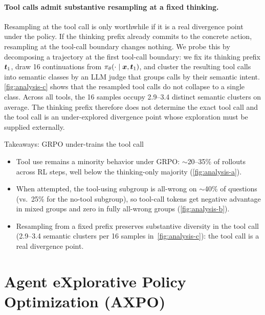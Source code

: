 \paragraph{Tool calls admit substantive resampling at a fixed thinking.}
Resampling at the tool call is only worthwhile if it is a real divergence point under the policy.
If the thinking prefix already commits to the concrete action, resampling at the tool-call boundary changes nothing.
We probe this by decomposing a trajectory at the first tool-call boundary: we fix its thinking prefix ${\bm{t}}_1$, draw 16 continuations from $\pi_\theta(\cdot \mid {\bm{x}}, {\bm{t}}_1)$, and cluster the resulting tool calls into semantic classes by an LLM judge that groups calls by their semantic intent. \autoref{fig:analysis-c} shows that the resampled tool calls do not collapse to a single class. Across all tools, the 16 samples occupy 2.9--3.4 distinct semantic clusters on average. The thinking prefix therefore does not determine the exact tool call and the tool call is an under-explored divergence point whose exploration must be supplied externally.

\begin{takeawaybox}{Takeaways: GRPO under-trains the tool call}
\begin{itemize}[leftmargin=*, itemsep=1pt, topsep=2pt]
    \item Tool use remains a minority behavior under GRPO: $\sim$20--35\% of rollouts across RL steps, well below the thinking-only majority (\autoref{fig:analysis-a}).
    \item When attempted, the tool-using subgroup is all-wrong on $\sim$40\% of questions (vs.\ 25\% for the no-tool subgroup), so tool-call tokens get negative advantage in mixed groups and zero in fully all-wrong groups (\autoref{fig:analysis-b}).
    \item Resampling from a fixed prefix preserves substantive diversity in the tool call (2.9--3.4 semantic clusters per 16 samples in~\autoref{fig:analysis-c}): the tool call is a real divergence point.
\end{itemize}
\end{takeawaybox}


\section{Agent eXplorative Policy Optimization (AXPO)}
\label{sec:method}

\subsection{\Toolresample}
\label{sec:branching}

